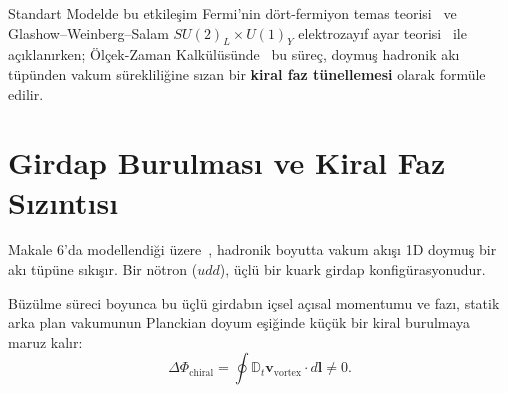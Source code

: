 \documentclass[11pt,a4paper]{article}
\begin{document}
Standart Modelde bu etkileşim Fermi'nin dört-fermiyon temas teorisi~\cite{fermi1934} ve Glashow--Weinberg--Salam $SU(2)_L \times U(1)_Y$ elektrozayıf ayar teorisi~\cite{weinberg1967,salam1968} ile açıklanırken; Ölçek-Zaman Kalkülüsünde~\cite{scale_calculus} bu süreç, doymuş hadronik akı tüpünden vakum sürekliliğine sızan bir \textbf{kiral faz tünellemesi} olarak formüle edilir.

\section{Girdap Burulması ve Kiral Faz Sızıntısı}
\label{sec:kiral_sizinti}

Makale 6'da modellendiği üzere~\cite{paper6}, hadronik boyutta vakum akışı 1D doymuş bir akı tüpüne sıkışır. Bir nötron ($udd$), üçlü bir kuark girdap konfigürasyonudur.

Büzülme süreci boyunca bu üçlü girdabın içsel açısal momentumu ve fazı, statik arka plan vakumunun Planckian doyum eşiğinde küçük bir kiral burulmaya maruz kalır:
\begin{equation}
    \Delta \Phi_{\mathrm{chiral}} = \oint \mathbb{D}_t \mathbf{v}_{\mathrm{vortex}} \cdot d\mathbf{l} \neq 0.
    \label{eq:kiral_burulma_tr}
\end{equation}
\end{document}
